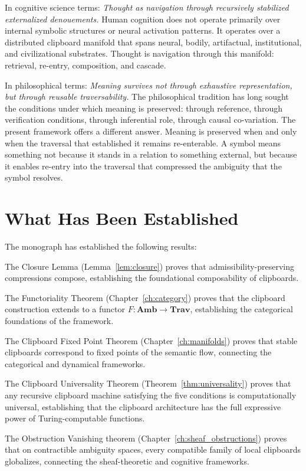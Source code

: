 \documentclass[12pt,oneside]{book}
\theoremstyle{plain}
\theoremstyle{definition}
\theoremstyle{plain}
\newcommand{\Trav}{\mathbf{Trav}}
\newcommand{\Amb}{\mathbf{Amb}}
\begin{document}
In cognitive science terms: \textit{Thought as navigation through recursively stabilized externalized denouements.} Human cognition does not operate primarily over internal symbolic structures or neural activation patterns. It operates over a distributed clipboard manifold that spans neural, bodily, artifactual, institutional, and civilizational substrates. Thought is navigation through this manifold: retrieval, re-entry, composition, and cascade.

In philosophical terms: \textit{Meaning survives not through exhaustive representation, but through reusable traversability.} The philosophical tradition has long sought the conditions under which meaning is preserved: through reference, through verification conditions, through inferential role, through causal co-variation. The present framework offers a different answer. Meaning is preserved when and only when the traversal that established it remains re-enterable. A symbol means something not because it stands in a relation to something external, but because it enables re-entry into the traversal that compressed the ambiguity that the symbol resolves.

\section{What Has Been Established}

The monograph has established the following results:

The Closure Lemma (Lemma~\ref{lem:closure}) proves that admissibility-preserving compressions compose, establishing the foundational composability of clipboards.

The Functoriality Theorem (Chapter~\ref{ch:category}) proves that the clipboard construction extends to a functor $F : \Amb \to \Trav$, establishing the categorical foundations of the framework.

The Clipboard Fixed Point Theorem (Chapter~\ref{ch:manifolds}) proves that stable clipboards correspond to fixed points of the semantic flow, connecting the categorical and dynamical frameworks.

The Clipboard Universality Theorem (Theorem~\ref{thm:universality}) proves that any recursive clipboard machine satisfying the five conditions is computationally universal, establishing that the clipboard architecture has the full expressive power of Turing-computable functions.

The Obstruction Vanishing theorem (Chapter~\ref{ch:sheaf_obstructions}) proves that on contractible ambiguity spaces, every compatible family of local clipboards globalizes, connecting the sheaf-theoretic and cognitive frameworks.
\end{document}

